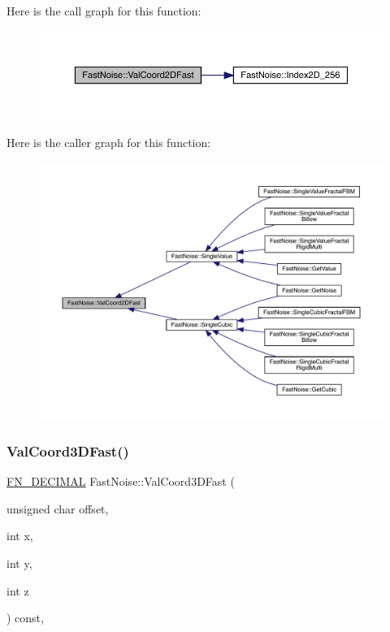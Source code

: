 Here is the call graph for this function\+:
\nopagebreak
\begin{figure}[H]
\begin{center}
\leavevmode
\includegraphics[width=350pt]{d1/dd8/class_fast_noise_ace751d0f7929c892937cd97f3e0341a7_cgraph}
\end{center}
\end{figure}
Here is the caller graph for this function\+:
\nopagebreak
\begin{figure}[H]
\begin{center}
\leavevmode
\includegraphics[width=350pt]{d1/dd8/class_fast_noise_ace751d0f7929c892937cd97f3e0341a7_icgraph}
\end{center}
\end{figure}
\mbox{\label{class_fast_noise_a8711ebad77216b74f5d248deb024de2f}} 
\subsubsection{\texorpdfstring{Val\+Coord3\+D\+Fast()}{ValCoord3DFast()}}
{\footnotesize\ttfamily \mbox{\hyperlink{_fast_noise_8h_a75a9ef6d2541c4921815b885bfd449c3}{F\+N\+\_\+\+D\+E\+C\+I\+M\+AL}} Fast\+Noise\+::\+Val\+Coord3\+D\+Fast (\begin{DoxyParamCaption}\item[{unsigned char}]{offset,  }\item[{int}]{x,  }\item[{int}]{y,  }\item[{int}]{z }\end{DoxyParamCaption}) const\hspace{0.3cm}{\ttfamily [inline]}, {\ttfamily [private]}}

